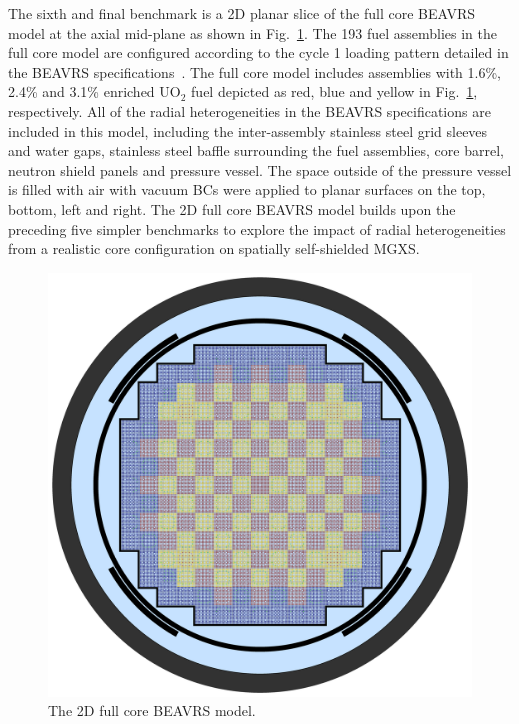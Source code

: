 The sixth and final benchmark is a 2D planar slice of the full core \ac{BEAVRS} model at the axial mid-plane as shown in Fig.~\ref{fig:chap7-full-core}. The 193 fuel assemblies in the full core model are configured according to the cycle 1 loading pattern detailed in the \ac{BEAVRS} specifications~\cite{horelik2013beavrs}. The full core model includes assemblies with 1.6\%, 2.4\% and 3.1\% enriched UO$_2$ fuel depicted as red, blue and yellow in Fig.~\ref{fig:chap7-full-core}, respectively. All of the radial heterogeneities in the \ac{BEAVRS} specifications are included in this model, including the inter-assembly stainless steel grid sleeves and water gaps, stainless steel baffle surrounding the fuel assemblies, core barrel, neutron shield panels and pressure vessel. The space outside of the pressure vessel is filled with air with vacuum \acp{BC} were applied to planar surfaces on the top, bottom, left and right. The 2D full core \ac{BEAVRS} model builds upon the preceding five simpler benchmarks to explore the impact of radial heterogeneities from a realistic core configuration on spatially self-shielded \ac{MGXS}.

\begin{figure}[h!]
  \centering
  \includegraphics[width=0.9\linewidth]{figures/benchmarks/full-core}
\vspace{2mm}
\caption[The 2D full core \ac{BEAVRS} model]{The 2D full core \ac{BEAVRS} model.}
\label{fig:chap7-full-core}
\end{figure}



